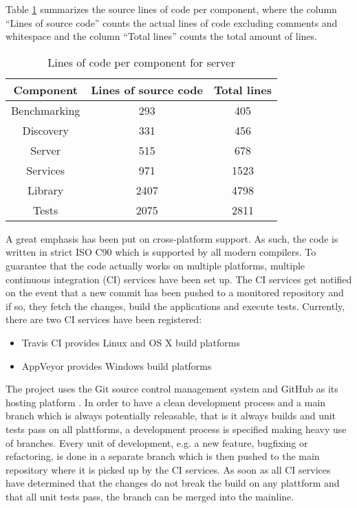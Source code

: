 Table \ref{tab:sloc} summarizes the source lines of code per component, where the column ``Lines of source code'' counts the actual lines of code excluding comments and whitespace and the column ``Total lines'' counts the total amount of lines.
\begin{table}
    \centering
    \begin{tabular}{|c|c|c|}
        \hline
        \bfseries Component & \bfseries Lines of source code & \bfseries Total lines\\
        \hline
        Benchmarking & 293 & 405\\
        \hline
        Discovery & 331 & 456\\
        \hline
        Server & 515 & 678\\
        \hline
        Services & 971 & 1523\\
        \hline
        Library & 2407 & 4798\\
        \hline
        Tests & 2075 & 2811 \\
        \hline
    \end{tabular}
    \caption{Lines of code per component for server}
    \label{tab:sloc}
\end{table}

A great emphasis has been put on cross-platform support.
As such, the code is written in strict ISO C90 \cite{iso-c90} which is supported by all modern compilers.
To guarantee that the code actually works on multiple platforms, multiple continuous integration (CI) services have been set up.
The CI services get notified on the event that a new commit has been pushed to a monitored repository and if so, they fetch the changes, build the applications and execute tests.
Currently, there are two CI services have been registered:
\begin{itemize}
    \item Travis CI \cite{travis} provides Linux and OS X build platforms
    \item AppVeyor \cite{appveyor} provides Windows build platforms
\end{itemize}

The project uses the Git source control management system \cite{git} and GitHub as its hosting platform \cite{github}.
In order to have a clean development process and a main branch which is always potentially releasable, that is it always builds and unit tests pass on all plattforms, a development process is specified making heavy use of branches.
Every unit of development, e.g. a new feature, bugfixing or refactoring, is done in a separate branch which is then pushed to the main repository where it is picked up by the CI services.
As soon as all CI services have determined that the changes do not break the build on any plattform and that all unit tests pass, the branch can be merged into the mainline.

